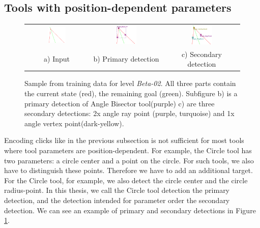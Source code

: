 \subsection{Tools with position-dependent parameters}
\label{position_dependent_pars}
\begin{figure}[h]
\centering
\begin{tabular}{c c c}

\includegraphics[width=0.3\textwidth]{img/ExampleTrainingData/02_02_input.png} &
\includegraphics[width=0.3\textwidth]{img/ExampleTrainingData/02_02_primary.png} &
\includegraphics[width=0.3\textwidth]{img/ExampleTrainingData/02_02_secondary.png} \\
a) Input & b) Primary detection & c) Secondary detection
\end{tabular}
\caption{Sample from training data for level \textit{Beta-02}. All three parts contain the current state (red), the remaining goal (green).
Subfigure b) is a primary detection of Angle Bisector tool(purple) c) are three secondary detections: 2x angle ray point (purple, turquoise) and 1x angle vertex point(dark-yellow).}
\label{training_data_primary_02_02}
\end{figure}
Encoding clicks like in the previous subsection is not sufficient for most tools where tool parameters are position-dependent. For example, the Circle tool has two parameters: a circle center and a point on the circle. For such tools, we also have to distinguish these points. Therefore we have to add an additional target. For the Circle tool, for example, we also detect the circle center and the circle radius-point. In this thesis, we call the Circle tool detection the primary detection, and the detection intended for parameter order the secondary detection. We can see an example of primary and secondary detections in Figure \ref{training_data_primary_02_02}.
